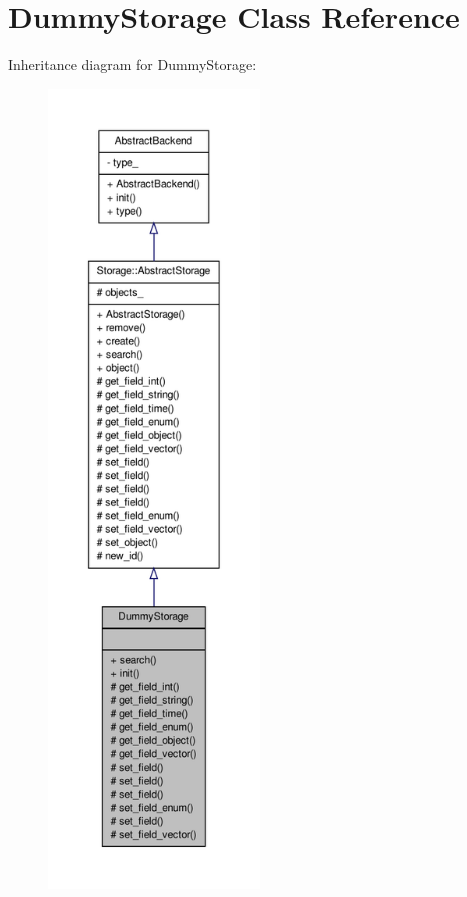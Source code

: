 \hypertarget{classDummyStorage}{
\section{DummyStorage Class Reference}
\label{d0/df2/classDummyStorage}
}


Inheritance diagram for DummyStorage:
\nopagebreak
\begin{figure}[H]
\begin{center}
\leavevmode
\includegraphics[height=600pt]{da/d63/classDummyStorage__inherit__graph}
\end{center}
\end{figure}


